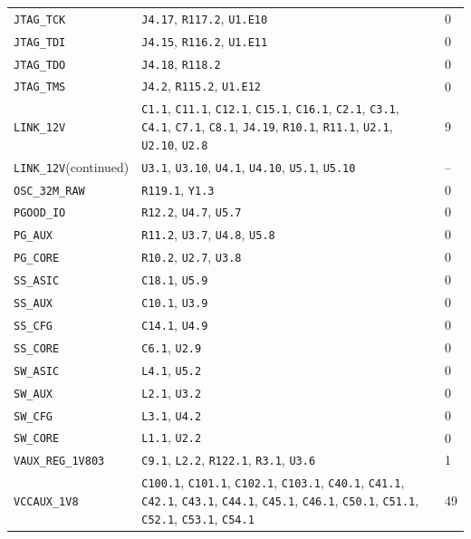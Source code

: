 \documentclass[11pt,a4paper]{article}
\begin{document}
\begin{longtable}{@{}P{48mm}P{109mm}P{10mm}@{}}
\nolinkurl{JTAG_TCK} & \nolinkurl{J4.17}, \nolinkurl{R117.2}, \nolinkurl{U1.E10} & 0 \\
\nolinkurl{JTAG_TDI} & \nolinkurl{J4.15}, \nolinkurl{R116.2}, \nolinkurl{U1.E11} & 0 \\
\nolinkurl{JTAG_TDO} & \nolinkurl{J4.18}, \nolinkurl{R118.2} & 0 \\
\nolinkurl{JTAG_TMS} & \nolinkurl{J4.2}, \nolinkurl{R115.2}, \nolinkurl{U1.E12} & 0 \\
\nolinkurl{LINK_12V} & \nolinkurl{C1.1}, \nolinkurl{C11.1}, \nolinkurl{C12.1}, \nolinkurl{C15.1}, \nolinkurl{C16.1}, \nolinkurl{C2.1}, \nolinkurl{C3.1}, \nolinkurl{C4.1}, \nolinkurl{C7.1}, \nolinkurl{C8.1}, \nolinkurl{J4.19}, \nolinkurl{R10.1}, \nolinkurl{R11.1}, \nolinkurl{U2.1}, \nolinkurl{U2.10}, \nolinkurl{U2.8} & 9 \\
\nolinkurl{LINK_12V}\newline (continued) & \nolinkurl{U3.1}, \nolinkurl{U3.10}, \nolinkurl{U4.1}, \nolinkurl{U4.10}, \nolinkurl{U5.1}, \nolinkurl{U5.10} & -- \\
\nolinkurl{OSC_32M_RAW} & \nolinkurl{R119.1}, \nolinkurl{Y1.3} & 0 \\
\nolinkurl{PGOOD_IO} & \nolinkurl{R12.2}, \nolinkurl{U4.7}, \nolinkurl{U5.7} & 0 \\
\nolinkurl{PG_AUX} & \nolinkurl{R11.2}, \nolinkurl{U3.7}, \nolinkurl{U4.8}, \nolinkurl{U5.8} & 0 \\
\nolinkurl{PG_CORE} & \nolinkurl{R10.2}, \nolinkurl{U2.7}, \nolinkurl{U3.8} & 0 \\
\nolinkurl{SS_ASIC} & \nolinkurl{C18.1}, \nolinkurl{U5.9} & 0 \\
\nolinkurl{SS_AUX} & \nolinkurl{C10.1}, \nolinkurl{U3.9} & 0 \\
\nolinkurl{SS_CFG} & \nolinkurl{C14.1}, \nolinkurl{U4.9} & 0 \\
\nolinkurl{SS_CORE} & \nolinkurl{C6.1}, \nolinkurl{U2.9} & 0 \\
\nolinkurl{SW_ASIC} & \nolinkurl{L4.1}, \nolinkurl{U5.2} & 0 \\
\nolinkurl{SW_AUX} & \nolinkurl{L2.1}, \nolinkurl{U3.2} & 0 \\
\nolinkurl{SW_CFG} & \nolinkurl{L3.1}, \nolinkurl{U4.2} & 0 \\
\nolinkurl{SW_CORE} & \nolinkurl{L1.1}, \nolinkurl{U2.2} & 0 \\
\nolinkurl{VAUX_REG_1V803} & \nolinkurl{C9.1}, \nolinkurl{L2.2}, \nolinkurl{R122.1}, \nolinkurl{R3.1}, \nolinkurl{U3.6} & 1 \\
\nolinkurl{VCCAUX_1V8} & \nolinkurl{C100.1}, \nolinkurl{C101.1}, \nolinkurl{C102.1}, \nolinkurl{C103.1}, \nolinkurl{C40.1}, \nolinkurl{C41.1}, \nolinkurl{C42.1}, \nolinkurl{C43.1}, \nolinkurl{C44.1}, \nolinkurl{C45.1}, \nolinkurl{C46.1}, \nolinkurl{C50.1}, \nolinkurl{C51.1}, \nolinkurl{C52.1}, \nolinkurl{C53.1}, \nolinkurl{C54.1} & 49 \\

\end{longtable}
\end{document}
